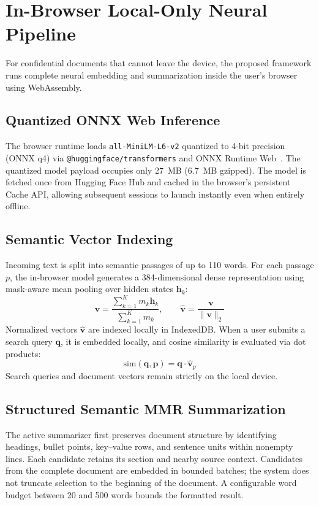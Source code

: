 \documentclass[conference]{IEEEtran}
\begin{document}
\section{In-Browser Local-Only Neural Pipeline}

For confidential documents that cannot leave the device, the proposed framework runs complete neural embedding and summarization inside the user's browser using WebAssembly.

\subsection{Quantized ONNX Web Inference}
The browser runtime loads \texttt{all-MiniLM-L6-v2} quantized to 4-bit precision (ONNX q4) via \texttt{@huggingface/transformers} and ONNX Runtime Web~\cite{onnxweb,wang2020miniLM}.
The quantized model payload occupies only 27~MB (6.7~MB gzipped).
The model is fetched once from Hugging Face Hub and cached in the browser's persistent Cache API, allowing subsequent sessions to launch instantly even when entirely offline.

\subsection{Semantic Vector Indexing}
Incoming text is split into semantic passages of up to 110 words.
For each passage $p$, the in-browser model generates a 384-dimensional dense representation using mask-aware mean pooling over hidden states $\mathbf{h}_k$:
\begin{equation}
  \mathbf{v} = \frac{\sum_{k=1}^K m_k \mathbf{h}_k}{\sum_{k=1}^K m_k}, \qquad \hat{\mathbf{v}} = \frac{\mathbf{v}}{\|\mathbf{v}\|_2}
\end{equation}
Normalized vectors $\hat{\mathbf{v}}$ are indexed locally in IndexedDB.
When a user submits a search query $\mathbf{q}$, it is embedded locally, and cosine similarity is evaluated via dot products:
\begin{equation}
  \text{sim}(\mathbf{q}, \mathbf{p}) = \mathbf{q} \cdot \hat{\mathbf{v}}_p
\end{equation}
Search queries and document vectors remain strictly on the local device.

\subsection{Structured Semantic MMR Summarization}
The active summarizer first preserves document structure by identifying headings, bullet points, key--value rows, and sentence units within nonempty lines. Each candidate retains its section and nearby source context. Candidates from the complete document are embedded in bounded batches; the system does not truncate selection to the beginning of the document. A configurable word budget between 20 and 500 words bounds the formatted result.
\end{document}
